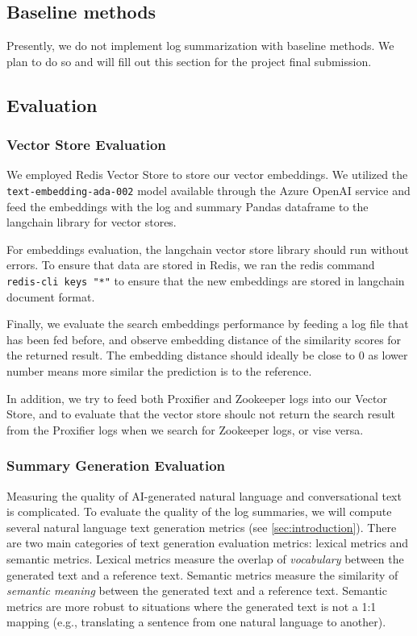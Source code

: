 \documentclass[conference]{IEEEtran}
\begin{document}
\subsection{Baseline methods}

Presently, we do not implement log summarization with baseline methods. We plan to do so and will fill out this section for the project final submission.

\subsection{Evaluation}

\subsubsection{Vector Store Evaluation}

We employed Redis Vector Store to store our vector embeddings. We utilized the \lstinline{text-embedding-ada-002} model available through the Azure OpenAI service and feed the embeddings with the log and summary Pandas dataframe to the langchain library for vector stores. \cite{ruoccofabrizio}

For embeddings evaluation, the langchain vector store library should run without errors. To ensure that data are stored in Redis, we ran the redis command \lstinline{redis-cli keys "*"} to ensure that the new embeddings are stored in langchain document format. 

Finally, we evaluate the search embeddings performance by feeding a log file that has been fed before, and observe embedding distance of the similarity scores for the returned result. The embedding distance should ideally be close to 0 as lower number means more similar the prediction is to the reference. 

In addition, we try to feed both Proxifier and Zookeeper logs into our Vector Store, and to evaluate that the vector store shoulc not return the search result from the Proxifier logs when we search for Zookeeper logs, or vise versa.

\subsubsection{Summary Generation Evaluation}

Measuring the quality of AI-generated natural language and conversational text is complicated. \cite{wang2023rethinking} To evaluate the quality of the log summaries, we will compute several natural language text generation metrics (see \ref{sec:introduction}). There are two main categories of text generation evaluation metrics: lexical metrics and semantic metrics. Lexical metrics measure the overlap of \textit{vocabulary} between the generated text and a reference text. Semantic metrics measure the similarity of \textit{semantic meaning} between the generated text and a reference text. Semantic metrics are more robust to situations where the generated text is not a 1:1 mapping (e.g., translating a sentence from one natural language to another).
\end{document}
